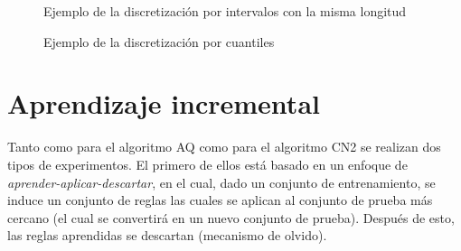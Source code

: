 \documentclass[12pt]{report}
\theoremstyle{break}
\theoremstyle{break}
\begin{document}
\begin{figure}[ht]
\centering
{}
\caption{\label{imagen:discretizacion intervalos} Ejemplo de la discretización por intervalos con la misma longitud}
\end{figure}

\begin{figure}[ht]
\centering
{}
\caption{\label{imagen:discretizacion cuantiles} Ejemplo de la discretización por cuantiles}
\end{figure}


\section{Aprendizaje incremental}
\label{seccion:aprendizaje incremental}
Tanto como para el algoritmo AQ como para el algoritmo CN2 se realizan dos tipos de experimentos. El primero de ellos está basado en un enfoque de \textit{aprender-aplicar-descartar}, en el cual, dado un conjunto de entrenamiento, se induce un conjunto de reglas las cuales se aplican al conjunto de prueba más cercano (el cual se convertirá en un nuevo conjunto de prueba). Después de esto, las reglas aprendidas se descartan (mecanismo de olvido).
\end{document}
